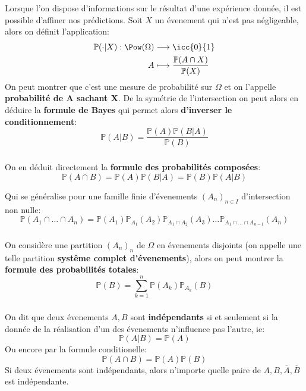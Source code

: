 \chapter*{} %
Lorsque l'on dispose d'informations sur le résultat d'une expérience donnée, il est possible d'affiner nos
prédictions. \+
Soit \(X\) un évenement qui n'est pas négligeable, alors on définit l'application:
\[
   \begin{aligned}
      \mathbb{P}( \cdot | X): \Pow(\Omega) &\longrightarrow \icc{0}{1}\\
      A &\longmapsto \frac{\mathbb{P}(A \cap X)}{\mathbb{P}(X)}
   \end{aligned}
\]
On peut montrer que c'est une mesure de probabilité sur \(\Omega\) et on l'appelle \textbf{probabilité de A sachant X}. De la symétrie de l'intersection on peut alors en déduire la \textbf{formule de Bayes} qui permet alors \textbf{d'inverser le conditionnement}:
\[
   \mathbb{P}(A | B) = \frac{\mathbb{P}(A) \mathbb{P}(B | A)}{\mathbb{P}(B)}
\]
\subsection*{}
On en déduit directement la \textbf{formule des probabilités composées}:
\[
      \mathbb{P}(A \cap B) = \mathbb{P}(A)\mathbb{P}(B | A) = \mathbb{P}(B)\mathbb{P}(A | B)
\]

Qui se généralise pour une famille finie d'évenements \((A_n)_{n \in I}\) d'intersection non nulle:
\[
   \mathbb{P}(A_1 \cap \ldots \cap A_n) = \mathbb{P}(A_1)\mathbb{P}_{A_1}(A_2)\mathbb{P}_{A_1\cap A_2}(A_3)\ldots\mathbb{P}_{A_1\cap \ldots \cap A_{n-1}}(A_n)
\]
\subsection*{}
On considère une partition \((A_n)_n\) de \( \Omega \) en évenements disjoints (on appelle une telle partition \textbf{systême complet d'évenements}), alors on peut montrer la \textbf{formule des probabilités totales}:
\[
   \mathbb{P}(B) = \sum_{k=1}^{n} \mathbb{P}(A_k) \mathbb{P}_{A_k}(B)
\]
\subsection*{}
On dit que deux évenements \(A, B\) sont \textbf{indépendants} si et seulement si la donnée de la réalisation d'un des évenements n'influence pas l'autre, ie:
\[ 
   \mathbb{P}(A | B) = \mathbb{P}(A)  
\]
Ou encore par la formule conditionelle:
\[
      \mathbb{P}(A \cap B) = \mathbb{P}(A)\mathbb{P}(B)
\]
Si deux évenements sont indépendants, alors n'importe quelle paire de \(A, B, \overline{A}, \overline{B}\) est indépendante.
